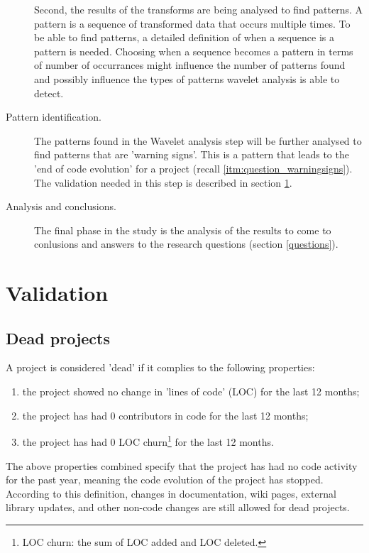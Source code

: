 \begin{description}
	Second, the results of the transforms are being analysed to find patterns. A
	pattern is a sequence of transformed data that occurs multiple times. To be
	able to find patterns, a detailed definition of when a sequence is a
	pattern is needed. Choosing when a sequence becomes a pattern in terms of
	number of occurrances might influence the number of patterns found and
	possibly influence the types of patterns wavelet analysis is able to detect.
	
	\item[Pattern identification.] The patterns found in the Wavelet analysis step
	will be further analysed to find patterns that are 'warning signs'. This is a
	pattern that leads to the 'end of code evolution' for a project (recall
	\ref{itm:question_warningsigns}). The validation needed in this step is
	described in section \ref{method:validation}.
	
	\item[Analysis and conclusions.] The final phase in the study is the analysis
	of the results to come to conlusions and answers to the research questions
	(section \ref{questions}).
\end{description}

\section{Validation}
\label{method:validation}
\subsection{Dead projects}
\label{def:dead}
A project is considered 'dead' if it complies to the following properties:
\begin{enumerate}
	\item the project showed no change in 'lines of code' (LOC) for the last 12
	months;
	\item the project has had 0 contributors in code for the last 12 months;
	\item the project has had 0 LOC churn\footnote{LOC churn: the sum of LOC added
	and LOC deleted.} for the last 12 months.
\end{enumerate}

\noindent
The above properties combined specify that the project has had no code activity
for the past year, meaning the code evolution of the project has stopped.
According to this definition, changes in documentation, wiki pages, external
library updates, and other non-code changes are still allowed for dead
projects.

